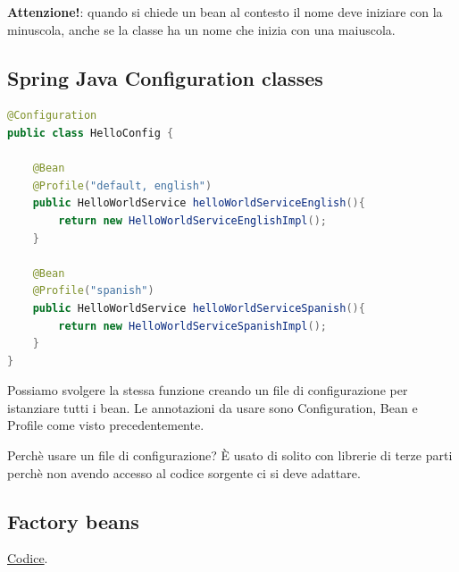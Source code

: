 \documentclass[11pt,a4paper]{book}
\begin{document}
\textbf{Attenzione!}: quando si chiede un bean al contesto il nome deve iniziare con la minuscola, anche se la classe ha un nome che inizia con una maiuscola.

\subsection{Spring Java Configuration classes}
\begin{lstlisting}[language = Java]
@Configuration
public class HelloConfig {

    @Bean
    @Profile("default, english")
    public HelloWorldService helloWorldServiceEnglish(){
        return new HelloWorldServiceEnglishImpl();
    }
    
    @Bean
    @Profile("spanish")
    public HelloWorldService helloWorldServiceSpanish(){
        return new HelloWorldServiceSpanishImpl();
    }
}

\end{lstlisting}

Possiamo svolgere la stessa funzione creando un file di configurazione per istanziare tutti i bean. Le annotazioni da usare sono Configuration, Bean e Profile come visto precedentemente.

Perchè usare un file di configurazione? È usato di solito con librerie di terze parti perchè non avendo accesso al codice sorgente ci si deve adattare.
\subsection{Factory beans}
\href{Codici/Beans}{Codice}.
\end{document}
